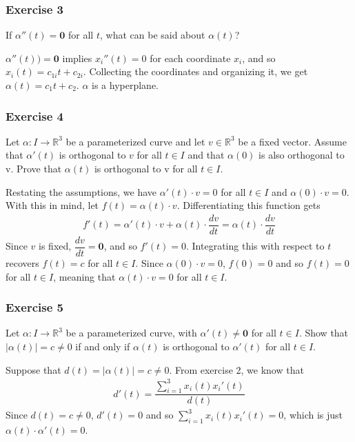 \documentclass{article}
\newcommand{\R}{\mathbb{R}}
\begin{document}
	\subsubsection*{Exercise 3}
	If $\alpha''(t) = \mathbf{0}$ for all $t$, what can be said about $\alpha(t)$?
	
	$\alpha''(t)) = \mathbf{0}$ implies $x_i''(t) = 0$ for each coordinate $x_i$, and so $x_i(t) = c_{1i} t + c_{2i}$. Collecting the coordinates and organizing it, we get $\alpha(t) = c_1 t + c_2$. $\alpha$ is a hyperplane.
	
	\subsubsection*{Exercise 4}
	Let $\alpha \colon I \to \R^3$ be a parameterized curve and let $v \in \R^3$ be a fixed vector. Assume that $\alpha'(t)$ is orthogonal to $v$ for all $t \in I$ and that $\alpha(0)$ is also orthogonal to v. Prove that $\alpha(t)$ is orthogonal to v for all $t \in I$.
	
	Restating the assumptions, we have $\alpha'(t) \cdot v = 0$ for all $t \in I$ and $\alpha(0) \cdot v = 0$. With this in mind, let $f(t) = \alpha(t) \cdot v$. Differentiating this function gets
	\begin{gather*}
		f'(t) = \alpha'(t) \cdot v + \alpha(t) \cdot \dfrac{dv}{dt} = \alpha(t) \cdot \dfrac{dv}{dt}
	\end{gather*}
	Since $v$ is fixed, $\dfrac{dv}{dt} = \mathbf{0}$, and so $f'(t) = 0$. Integrating this with respect to $t$ recovers $f(t) = c$ for all $t \in I$. Since $\alpha(0) \cdot v = 0$, $f(0) = 0$ and so $f(t) = 0$ for all $t \in I$, meaning that $\alpha(t) \cdot v = 0$ for all $t \in I$.
	
	\subsubsection*{Exercise 5}
	Let $\alpha \colon I \to \R^3$ be a parameterized curve, with $\alpha'(t) \neq \mathbf{0}$ for all $t \in I$. Show that $| \alpha(t) | = c \neq 0$ if and only if $\alpha(t)$ is orthogonal to $\alpha'(t)$ for all $t \in I$.
	
	Suppose that $d(t) = | \alpha(t) | = c \neq 0$. From exercise 2, we know that
	\begin{gather*}
		d'(t) = \dfrac{ \sum_{i=1}^{3} x_i(t)x_i'(t) } {d(t)}
	\end{gather*}
	Since $d(t) = c \neq 0$, $d'(t) = 0$ and so $\sum_{i=1}^{3} x_i(t)x_i'(t) = 0$, which is just $\alpha(t) \cdot \alpha'(t) = 0$.
\end{document}
